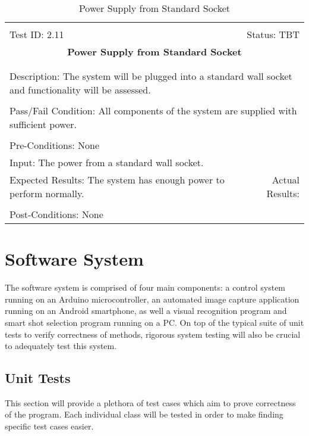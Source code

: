 \documentclass[titlepage]{article}
\begin{document}
\begin{center}%
\begin{table}[h!]
\begin{tabular}{|l r|}\hline&\\[-2mm]
	Test ID: 2.11	&Status: TBT\\[-3mm]
	\multicolumn{2}{|c|}{\textbf{\large{Power Supply from Standard Socket}}}\\&\\\hline&\\[-3mm]
	\multicolumn{2}{|p{\textwidth}|}{Description: The system will be plugged into a standard wall socket and functionality will be assessed.}\\[1mm]\hline&\\[-3mm]
	\multicolumn{2}{|p{\textwidth}|}{Pass/Fail Condition: All components of the system are supplied with sufficient power.}\\[1mm]\hline&\\[-3mm]
	\multicolumn{2}{|p{\textwidth}|}{Pre-Conditions: None}\\[4mm]
	\multicolumn{2}{|p{\textwidth}|}{Input: The power from a standard wall socket.}\\[2mm]\hline
	\multicolumn{1}{|p{0.49\textwidth}}{Expected Results: The system has enough power to perform normally.}	&\multicolumn{1}{|p{0.45\textwidth}|}{Actual Results:}\\\hline&\\[-3mm]
	\multicolumn{2}{|p{\textwidth}|}{Post-Conditions: None}\\\hline
\end{tabular}
\caption{Power Supply from Standard Socket}
\end{table}
\end{center}


\section{Software System}
The software system is comprised of four main components: a control system running on an Arduino microcontroller, an automated image capture application running on an Android smartphone, as well a visual recognition program and smart shot selection program running on a PC. On top of the typical suite of unit tests to verify correctness of methods, rigorous system testing will also be crucial to adequately test this system.

\subsection{Unit Tests}
This section will provide a plethora of test cases which aim to prove correctness of the program. Each individual class will be tested in order to make finding specific test cases easier.
\end{document}
